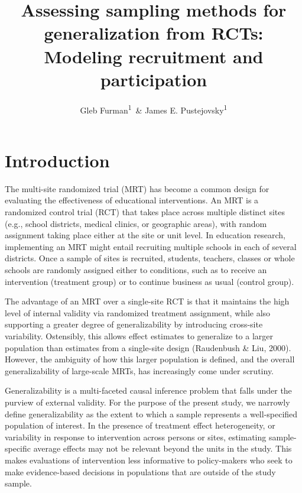 \documentclass[man,floatsintext]{apa6}
\title{Assessing sampling methods for generalization from RCTs: Modeling recruitment and participation}
\author{Gleb Furman\textsuperscript{1}~\& James E. Pustejovsky\textsuperscript{1}}
\date{}
\affiliation{
\vspace{0.5cm}
\textsuperscript{1} University of Texas at Austin}
\begin{document}
\maketitle

\hypertarget{introduction}{%
\section{Introduction}\label{introduction}}

The multi-site randomized trial (MRT) has become a common design for evaluating the effectiveness of educational interventions. An MRT is a randomized control trial (RCT) that takes place across multiple distinct sites (e.g., school districts, medical clinics, or geographic areas), with random assignment taking place either at the site or unit level. In education research, implementing an MRT might entail recruiting multiple schools in each of several districts. Once a sample of sites is recruited, students, teachers, classes or whole schools are randomly assigned either to conditions, such as to receive an intervention (treatment group) or to continue business as usual (control group).

The advantage of an MRT over a single-site RCT is that it maintains the high level of internal validity via randomized treatment assignment, while also supporting a greater degree of generalizability by introducing cross-site variability. Ostensibly, this allows effect estimates to generalize to a larger population than estimates from a single-site design (Raudenbush \& Liu, 2000). However, the ambiguity of how this larger population is defined, and the overall generalizability of large-scale MRTs, has increasingly come under scrutiny.

Generalizability is a multi-faceted causal inference problem that falls under the purview of external validity. For the purpose of the present study, we narrowly define generalizability as the extent to which a sample represents a well-specified population of interest. In the presence of treatment effect heterogeneity, or variability in response to intervention across persons or sites, estimating sample-specific average effects may not be relevant beyond the units in the study. This makes evaluations of intervention less informative to policy-makers who seek to make evidence-based decisions in populations that are outside of the study sample.
\end{document}
